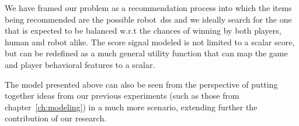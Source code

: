 We have framed our problem as a recommendation process into which the items being recommended are the possible robot~\glsdesc{ds}s and we ideally search for the one that is expected to be balanced w.r.t the chances of winning by both players, \ie human and robot alike. The score signal modeled is not limited to a scalar score, but can be redefined as a much general utility function that can map the game and player behavioral features to a scalar. 

The model presented above can also be seen from the perspective of putting together ideas from our previous experiments (such as those from chapter~\ref{ch:modeling}) in a much more scenario, extending further the contribution of our research.